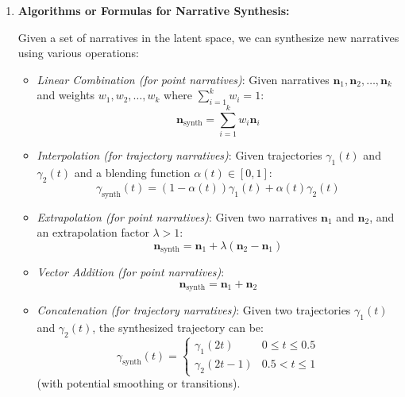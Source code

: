 \documentclass[12pt, a4paper]{article}
\begin{document}
\begin{enumerate}
\item \textbf{Algorithms or Formulas for Narrative Synthesis:}

Given a set of narratives in the latent space, we can synthesize new narratives using various operations:

\begin{itemize}
    \item \textit{Linear Combination (for point narratives)}: Given narratives $\mathbf{n}_1, \mathbf{n}_2, \dots, \mathbf{n}_k$ and weights $w_1, w_2, \dots, w_k$ where $\sum_{i=1}^k w_i = 1$:
    \begin{equation*}
        \mathbf{n}_{\text{synth}} = \sum_{i=1}^k w_i \mathbf{n}_i
    \end{equation*}

    \item \textit{Interpolation (for trajectory narratives)}: Given trajectories $\gamma_1(t)$ and $\gamma_2(t)$ and a blending function $\alpha(t) \in [0, 1]$:
    \begin{equation*}
        \gamma_{\text{synth}}(t) = (1 - \alpha(t)) \gamma_1(t) + \alpha(t) \gamma_2(t)
    \end{equation*}

    \item \textit{Extrapolation (for point narratives)}: Given two narratives $\mathbf{n}_1$ and $\mathbf{n}_2$, and an extrapolation factor $\lambda > 1$:
    \begin{equation*}
        \mathbf{n}_{\text{synth}} = \mathbf{n}_1 + \lambda (\mathbf{n}_2 - \mathbf{n}_1)
    \end{equation*}

    \item \textit{Vector Addition (for point narratives)}:
    \begin{equation*}
        \mathbf{n}_{\text{synth}} = \mathbf{n}_1 + \mathbf{n}_2
    \end{equation*}

    \item \textit{Concatenation (for trajectory narratives)}: Given two trajectories $\gamma_1(t)$ and $\gamma_2(t)$, the synthesized trajectory can be:
    \begin{equation*}
        \gamma_{\text{synth}}(t) =
        \begin{cases}
            \gamma_1(2t) & 0 \leq t \leq 0.5 \\
            \gamma_2(2t - 1) & 0.5 < t \leq 1
        \end{cases}
    \end{equation*}
    (with potential smoothing or transitions).


\end{itemize}
\end{enumerate}
\end{document}

